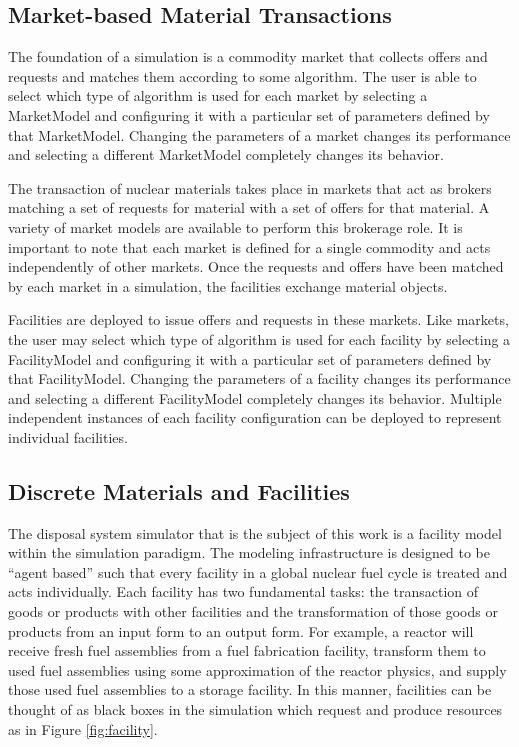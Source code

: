 \subsection{Market-based Material Transactions}

The foundation of a simulation is a commodity market that collects 
offers and requests and matches them according to some algorithm.  The 
user is able to select which type of algorithm is used for each market 
by selecting a MarketModel and configuring it with a particular set of 
parameters defined by that MarketModel.  Changing the parameters of a 
market changes its performance and selecting a different MarketModel 
completely changes its behavior.

The transaction of nuclear materials takes place in markets that act
as brokers matching a set of requests for material with a set of
offers for that material. A variety of market models are available
to perform this brokerage role. It is important to note that each
market is defined for a single commodity and acts independently of
other markets. Once the requests and offers have been matched by each
market in a simulation, the facilities exchange material objects.

Facilities are deployed to issue offers and requests in these markets.  
Like markets, the user may select which type of algorithm is used for 
each facility by selecting a FacilityModel and configuring it with a 
particular set of parameters defined by that FacilityModel.  Changing 
the parameters of a facility changes its performance and selecting a 
different FacilityModel completely changes its behavior.  
Multiple independent instances of each facility configuration 
can be deployed to represent individual facilities.


\subsection{Discrete Materials and Facilities}

The \Cyder disposal system simulator that is the subject of this work is a 
facility model within the \Cyclus simulation paradigm.  The \Cyclus modeling 
infrastructure is designed to be ``agent based'' such that every facility in a 
global nuclear fuel cycle is treated and acts individually.  Each facility has 
two fundamental tasks: the transaction of goods or products with other 
facilities and the transformation of those goods or products from an input form 
to an output form.  For example, a reactor will receive fresh fuel assemblies 
from a fuel fabrication facility, transform them to used fuel assemblies using 
some approximation of the reactor physics, and supply those used fuel 
assemblies to a storage facility. In this manner, facilities can be thought of 
as black boxes in the simulation which request and produce resources as in 
Figure \ref{fig:facility}.

